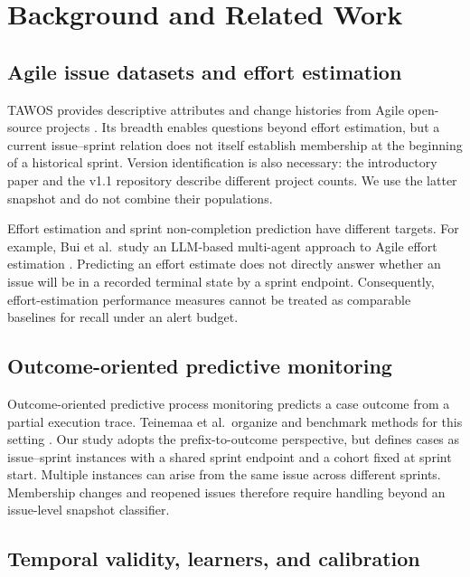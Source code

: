 \section{Background and Related Work}\label{background-and-related-work}

\subsection{Agile issue datasets and effort estimation}\label{agile-issue-datasets-and-effort-estimation}

TAWOS provides descriptive attributes and change histories from Agile open-source projects \cite{tawosi2022tawos,tawosv11}. Its breadth enables questions beyond effort estimation, but a current issue--sprint relation does not itself establish membership at the beginning of a historical sprint. Version identification is also necessary: the introductory paper and the v1.1 repository describe different project counts. We use the latter snapshot and do not combine their populations.

Effort estimation and sprint non-completion prediction have different targets. For example, Bui et al.~study an LLM-based multi-agent approach to Agile effort estimation \cite{bui2025agents}. Predicting an effort estimate does not directly answer whether an issue will be in a recorded terminal state by a sprint endpoint. Consequently, effort-estimation performance measures cannot be treated as comparable baselines for recall under an alert budget.

\subsection{Outcome-oriented predictive monitoring}\label{outcome-oriented-predictive-monitoring}

Outcome-oriented predictive process monitoring predicts a case outcome from a partial execution trace. Teinemaa et al.~organize and benchmark methods for this setting \cite{teinemaa2019outcome}. Our study adopts the prefix-to-outcome perspective, but defines cases as issue--sprint instances with a shared sprint endpoint and a cohort fixed at sprint start. Multiple instances can arise from the same issue across different sprints. Membership changes and reopened issues therefore require handling beyond an issue-level snapshot classifier.

\subsection{Temporal validity, learners, and calibration}\label{temporal-validity-learners-and-calibration}

